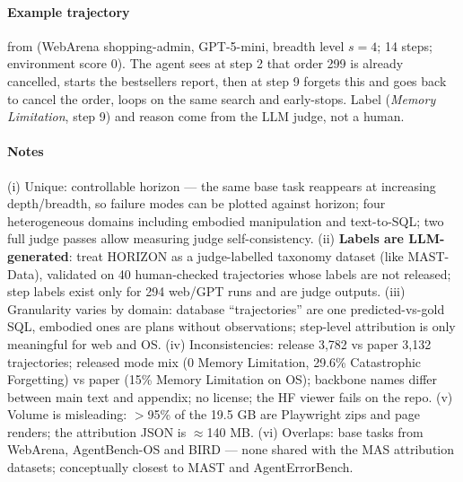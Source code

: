 \paragraph{Example trajectory}  from  (WebArena shopping-admin, GPT-5-mini, breadth level $s{=}4$; 14 steps; environment score 0). The agent sees at step 2 that order 299 is already cancelled, starts the bestsellers report, then at step 9 forgets this and goes back to cancel the order, loops on the same search and early-stops. Label (\emph{Memory Limitation}, step 9) and reason come from the LLM judge, not a human.


\paragraph{Notes} (i) Unique: controllable horizon --- the same base task reappears at increasing depth/breadth, so failure modes can be plotted against horizon; four heterogeneous domains including embodied manipulation and text-to-SQL; two full judge passes allow measuring judge self-consistency. (ii) \textbf{Labels are LLM-generated}: treat HORIZON as a judge-labelled taxonomy dataset (like MAST-Data), validated on 40 human-checked trajectories whose labels are not released; step labels exist only for 294 web/GPT runs and are judge outputs. (iii) Granularity varies by domain: database ``trajectories'' are one predicted-vs-gold SQL, embodied ones are plans without observations; step-level attribution is only meaningful for web and OS. (iv) Inconsistencies: release 3,782 vs paper 3,132 trajectories; released mode mix (0 Memory Limitation, 29.6\% Catastrophic Forgetting) vs paper (15\% Memory Limitation on OS); backbone names differ between main text and appendix; no license; the HF viewer fails on the repo. (v) Volume is misleading: $>$95\% of the 19.5 GB are Playwright zips and page renders; the attribution JSON is $\approx$140 MB. (vi) Overlaps: base tasks from WebArena, AgentBench-OS and BIRD --- none shared with the MAS attribution datasets; conceptually closest to MAST and AgentErrorBench.
